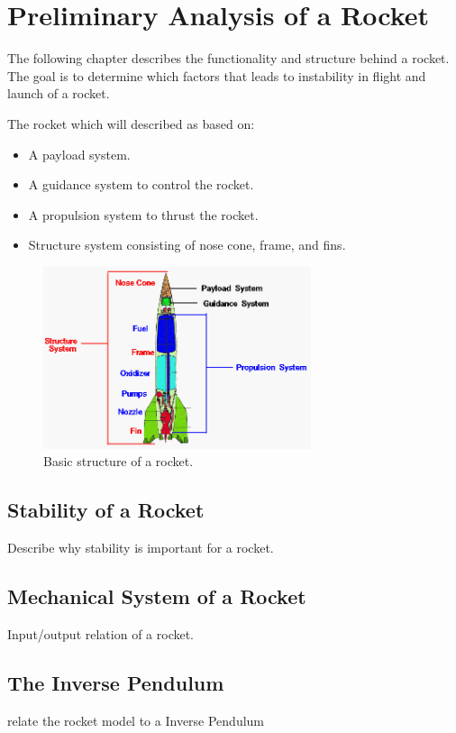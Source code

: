 \chapter{Preliminary Analysis of a Rocket}
The following chapter describes the functionality and structure behind a rocket. The goal is to determine which factors that leads to instability in flight and launch of a rocket. 
\bigbreak

The rocket which will described as based on:
\begin{itemize}[noitemsep]
\item A payload system.
\item A guidance system to control the rocket.
\item A propulsion system to thrust the rocket. 
\item Structure system consisting of nose cone, frame, and fins.
\end{itemize}    

\begin{figure}[htbp]
	\centering
 	\includegraphics[width=0.7\textwidth]{figures/RocketStructure.png} 
 	\caption{Basic structure of a rocket.}
 	\label{fig:RocketStructure}
\end{figure}


\section{Stability of a Rocket}
Describe why stability is important for a rocket. 
\section{Mechanical System of a Rocket}
Input/output relation of a rocket.
\section{The Inverse Pendulum}
relate the rocket model to a Inverse Pendulum